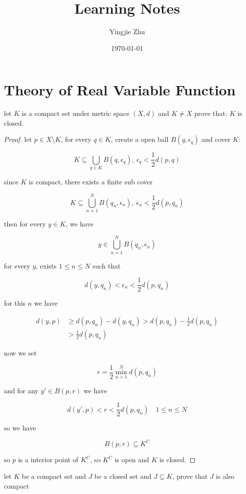 \documentclass[11pt,a4paper]{article}
\title{Learning Notes}
\author{Yingjie Zhu}
\date{\today}
\begin{document}
\section{Theory of Real Variable Function}

\begin{exercise}
    let $K$ is a compact set under metric space $(X,d)$ and $K \ne X$ prove that: $K$ is closed.


\end{exercise}

\begin{proof}
    let $p \in X \setminus K$, for every $q \in K$, create a open ball $B(q, \epsilon_q)$ and cover $K$:

    \[
        K \subseteq \bigcup_{q \in K} B(q, \epsilon_{q}), \: \epsilon_{q} < \frac{1}{2}d(p, q)
    \]

    since $K$ is compact, there exists a finite sub cover

    \[
    K \subseteq \bigcup_{n=1}^{N} B(q_n, \epsilon_{n}), \: \epsilon_{n} < \frac{1}{2}d(p, q_n)
    \]

    then for every $y \in K$, we have 

    \[
y \in \bigcup_{n=1}^{N} B(q_n, \epsilon_{n})
    \]

    for every $y$, exists $1 \le n \le N$ such that

    \[
        d(y, q_n) < \epsilon_n < \frac{1}{2}d(p, q_n)
    \]

    for this $n$ we have

    \begin{align*}
        d(y, p) &\ge d(p,q_n) - d(y, q_n) > d(p,q_n) - \frac{1}{2}d(p, q_n) \\
        & > \frac{1}{2}d(p, q_n)
    \end{align*}

    now we set 

    \[
        r = \frac{1}{2}\min_{n=1}^{N}d(p, q_n)
    \]

    and for any $y' \in B(p, r)$ we have

    \[
        d(y', p) < r < \frac{1}{2}d(p, q_n)\quad  1 \le n \le N
    \]

    so we have

    \[
        B(p, r) \subseteq K^C
    \]

    so $p$ is a interior point of $K^C$, so $K^C$ is open and $K$ is closed.
\end{proof}

\begin{exercise}
    let $K$ be a compact set and $J$ be a closed set and $J \subseteq K$, prove that $J$ is also compact
\end{exercise}
\end{document}
